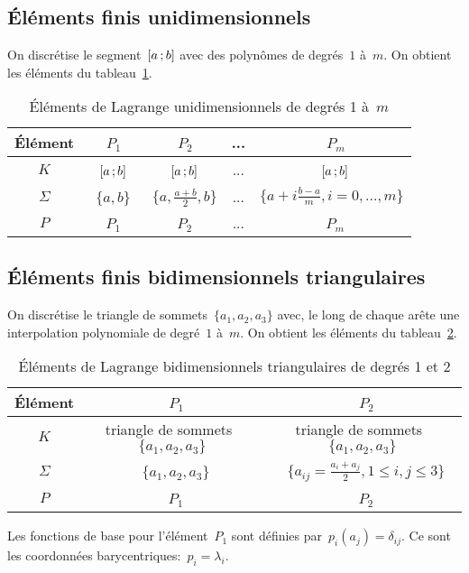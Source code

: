 \medskip
\subsection*{Éléments finis unidimensionnels}
On discrétise le segment~$\mathopen{[}a\,;b\mathclose{]}$ avec des polynômes de degrés~$1$ à~$m$.
On obtient les éléments du tableau~\ref{tab:Elem:uni}.
\begin{table}[ht]\centering\small
\begin{tabular}{c|cccc}
Élément &~$P_1$ &~$P_2$ & ... &~$P_m$\\
\hline
$K$	  &~$\mathopen{[}a\,;b\mathclose{]}$ &~$\mathopen{[}a\,;b\mathclose{]}$ & ... &~$\mathopen{[}a\,;b\mathclose{]}$\\
$\Sigma$ &~$\{a,b\}$ &~$\{a,\frac{a+b}2, b\}$& ... &$\{a+i\frac{b-a}m, i=0,\ldots, m\}$\\
$P$   &~$P_1$ &~$P_2$ & ... &~$P_m$\\
\hline
\end{tabular}
\caption{Éléments de Lagrange unidimensionnels de degrés 1 à~$m$}\label{tab:Elem:uni}
\end{table}

\medskip
\subsection*{Éléments finis bidimensionnels triangulaires}
On discrétise le triangle de sommets~$\{a_1, a_2, a_3\}$ avec, le long de chaque arête une interpolation polynomiale de degré~$1$ à~$m$.
On obtient les éléments du tableau~\ref{tab:Elem:bi}.
\begin{table}[ht]\centering\small
\begin{tabular}{c|cc}
Élément &~$P_1$ &~$P_2$ \\
\hline
$K$	  & triangle de sommets~$\{a_1, a_2, a_3\}$ & triangle de sommets~$\{a_1, a_2, a_3\}$\\
$\Sigma$ &~$\{a_1, a_2, a_3\}$ &~$\{a_{ij}=\frac{a_i+a_j}2, 1\le i,j\le 3\}$ \\
$P$   &~$P_1$ &~$P_2$ \\
\hline
\end{tabular}
\caption{Éléments de Lagrange bidimensionnels triangulaires de degrés 1 et 2}\label{tab:Elem:bi}
\end{table}

\begin{remarque}Les fonctions de base pour l'élément~$P_1$ sont définies par~$p_i(a_j) = \delta_{ij}$. Ce sont les coordonnées barycentriques:~$p_i = \lambda_i$.\end{remarque}

